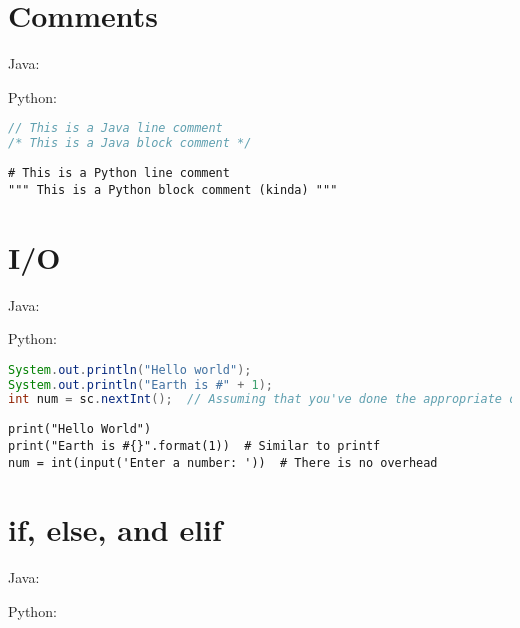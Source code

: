 \documentclass{article}
\begin{document}
\section{Comments}
\begin{minipage}{0.45\linewidth}
    Java:
\end{minipage}
\hfill
\begin{minipage}{0.45\linewidth}
    Python:
\end{minipage}

\begin{minipage}{0.45\linewidth}
    \begin{lstlisting}[language=Java]
// This is a Java line comment
/* This is a Java block comment */
    \end{lstlisting}
\end{minipage}
\hfill
\begin{minipage}{0.45\linewidth}
    \begin{lstlisting}
# This is a Python line comment
""" This is a Python block comment (kinda) """
    \end{lstlisting}
\end{minipage}

\section{I/O}
\begin{minipage}{0.45\linewidth}
    Java:
\end{minipage}
\hfill
\begin{minipage}{0.45\linewidth}
    Python:
\end{minipage}

\begin{minipage}{0.45\linewidth}
    \begin{lstlisting}[language=Java]
System.out.println("Hello world");
System.out.println("Earth is #" + 1);
int num = sc.nextInt();  // Assuming that you've done the appropriate overhead
    \end{lstlisting}
\end{minipage}
\hfill
\begin{minipage}{0.45\linewidth}
    \begin{lstlisting}
print("Hello World")
print("Earth is #{}".format(1))  # Similar to printf
num = int(input('Enter a number: '))  # There is no overhead
    \end{lstlisting}
\end{minipage}

\section{if, else, and elif}
\begin{minipage}{0.45\linewidth}
    Java:
\end{minipage}
\hfill
\begin{minipage}{0.45\linewidth}
    Python:
\end{minipage}
\end{document}
